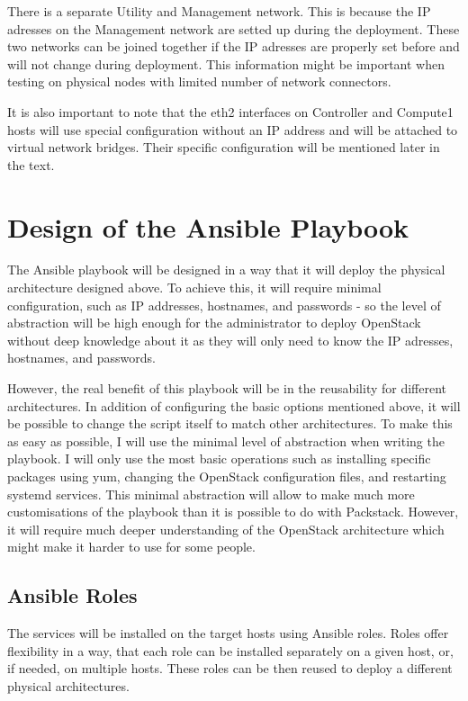 There is a separate Utility and Management network. This is because the IP adresses on the Management network are setted up during the deployment. These two networks can be joined together if the IP adresses are properly set before and will not change during deployment. This information might be important when testing on physical nodes with limited number of network connectors.

It is also important to note that the eth2 interfaces on Controller and Compute1 hosts will use special configuration without an IP address and will be attached to virtual network bridges. Their specific configuration will be mentioned later in the text.


\section{Design of the Ansible Playbook}

The Ansible playbook will be designed in a way that it will deploy the physical architecture designed above. To achieve this, it will require minimal configuration, such as IP addresses, hostnames, and passwords - so the level of abstraction will be high enough for the administrator to deploy OpenStack without deep knowledge about it as they will only need to know the IP adresses, hostnames, and passwords.

However, the real benefit of this playbook will be in the reusability for different architectures. In addition of configuring the basic options mentioned above, it will be possible to change the script itself to match other architectures. To make this as easy as possible, I will use the minimal level of abstraction when writing the playbook. I will only use the most basic operations such as installing specific packages using yum, changing the OpenStack configuration files, and restarting systemd services. This minimal abstraction will allow to make much more customisations of the playbook than it is possible to do with Packstack. However, it will require much deeper understanding of the OpenStack architecture which might make it harder to use for some people.

\subsection{Ansible Roles}
The services will be installed on the target hosts using Ansible roles. Roles offer flexibility in a way, that each role can be installed separately on a given host, or, if needed, on multiple hosts. These roles can be then reused to deploy a different physical architectures.


